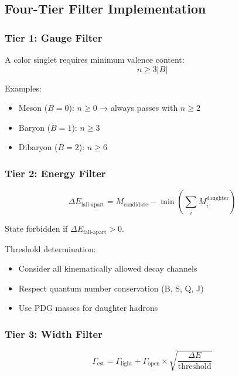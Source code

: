 \documentclass[12pt,a4paper]{article}
\begin{document}
\subsection{Four-Tier Filter Implementation}

\subsubsection{Tier 1: Gauge Filter}

A color singlet requires minimum valence content:
\begin{equation}
n \geq 3|B|
\end{equation}

Examples:
\begin{itemize}
\item Meson ($B=0$): $n \geq 0$ → always passes with $n \geq 2$
\item Baryon ($B=1$): $n \geq 3$
\item Dibaryon ($B=2$): $n \geq 6$
\end{itemize}

\subsubsection{Tier 2: Energy Filter}

\begin{equation}
\Delta E_{\text{fall-apart}} = M_{\text{candidate}} - \min\left(\sum_i M_i^{\text{daughter}}\right)
\end{equation}

State forbidden if $\Delta E_{\text{fall-apart}} > 0$.

Threshold determination:
\begin{itemize}
\item Consider all kinematically allowed decay channels
\item Respect quantum number conservation (B, S, Q, J)
\item Use PDG masses for daughter hadrons
\end{itemize}

\subsubsection{Tier 3: Width Filter}

\begin{equation}
\Gamma_{\text{est}} = \Gamma_{\text{light}} + \Gamma_{\text{open}} \times \sqrt{\frac{\Delta E}{\text{threshold}}}
\end{equation}
\end{document}
